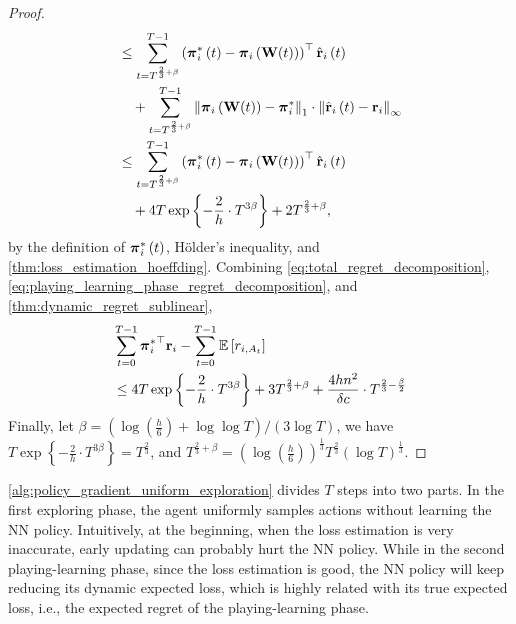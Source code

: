 \begin{proof}
\begin{equation}
\begin{split}
    &\le \sum\limits_{t=T^{\frac{2}{3} + \beta}}^{T-1}{ \left( {{\boldsymbol{\pi}}_i^*\left(t\right)} - {\boldsymbol{\pi}}_i\left( {\mathbf{W}}(t) \right) \right)^\top \hat{{\mathbf{r}}}_i\left(t\right) } \\
    &\quad + \sum\limits_{t=T^{\frac{2}{3} + \beta}}^{T-1}{  \left\| {\boldsymbol{\pi}}_i\left( {\mathbf{W}}(t) \right) - {\boldsymbol{\pi}}_i^* \right\|_1 \cdot \left\| \hat{{\mathbf{r}}}_i\left(t\right) - {\mathbf{r}}_i \right\|_\infty } \\
    &\le \sum\limits_{t=T^{\frac{2}{3} + \beta}}^{T-1}{ \left( {{\boldsymbol{\pi}}_i^*\left(t\right)} - {\boldsymbol{\pi}}_i\left( {\mathbf{W}}(t) \right) \right)^\top \hat{{\mathbf{r}}}_i\left(t\right) } \\
    &\quad + 4 T \exp\left\{ - \frac{2}{h} \cdot  T^{3\beta} \right\} + 2 T^{\frac{2}{3} + \beta},
\end{split}
\end{equation}
by the definition of ${\boldsymbol{\pi}}_i^*\left(t\right)$, H{\"o}lder's inequality, and \cref{thm:loss_estimation_hoeffding}. 
Combining \cref{eq:total_regret_decomposition}, \cref{eq:playing_learning_phase_regret_decomposition}, and \cref{thm:dynamic_regret_sublinear},
\begin{equation*}
\begin{split}
    &\sum\limits_{t=0}^{T-1}{ {{\boldsymbol{\pi}}_i^*}^\top {\mathbf{r}}_i } - \sum\limits_{t=0}^{T-1}{ {\mathbb{E}} \left[ r_{i, A_t} \right] } \\
    &\le  4 T \exp\left\{ - \frac{2}{h} \cdot  T^{3\beta} \right\} + 3 T^{\frac{2}{3} + \beta} + \frac{4 h n^2}{\delta c} \cdot T^{\frac{2}{3} - \frac{\beta}{2}}
\end{split}
\end{equation*}
Finally, let $\beta = \left( \log{\left(\frac{h}{6}\right) + \log{\log{T}} } \right)/\left(3 \log{T}\right)$, we have $T \exp\left\{ - \frac{2}{h} \cdot  T^{3\beta} \right\} = T^{\frac{2}{3}}$, and $T^{\frac{2}{3} + \beta} = \left( \log{\left(\frac{h}{6}\right)}\right)^{\frac{1}{3}} T^{\frac{2}{3}} \left(\log{T}\right)^{\frac{1}{3}}$.
\end{proof}

\cref{alg:policy_gradient_uniform_exploration} divides $T$ steps into two parts. In the first exploring phase, the agent uniformly samples actions without learning the NN policy. Intuitively, at the beginning, when the loss estimation is very inaccurate, early updating can probably hurt the NN policy.  While in the second playing-learning phase, since the loss estimation is good, the NN policy will keep reducing its dynamic expected loss, which is highly related with its true expected loss, i.e., the expected regret of the playing-learning phase.

